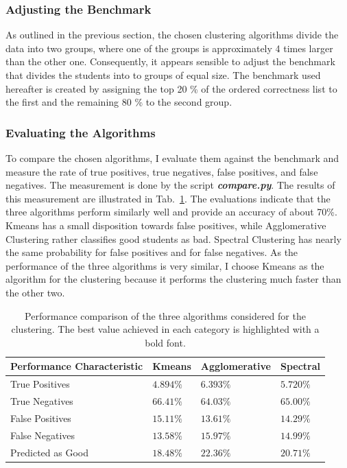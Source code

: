 \subsubsection{Adjusting the Benchmark}
As outlined in the previous section, the chosen clustering algorithms divide the data into two groups, where one of the groups is approximately 4 times larger than the other one. Consequently, it appears sensible to adjust the benchmark that divides the students into to groups of equal size. The benchmark used hereafter is created by assigning the top 20 \% of the ordered correctness list to the first and the remaining 80 \% to the second group.


\subsubsection{Evaluating the Algorithms}
To compare the chosen algorithms, I evaluate them against the benchmark and measure the rate of true positives, true negatives, false positives, and false negatives. The measurement is done by the script \textbf{\emph{compare.py}}. The results of this measurement are illustrated in Tab.~\ref{tab_comparison}. The evaluations indicate that the three algorithms perform similarly well and provide an accuracy of about 70\%. Kmeans has a small disposition towards false positives, while Agglomerative Clustering rather classifies good students as bad. Spectral Clustering has nearly the same probability for false positives and for false negatives. As the performance of the three algorithms is very similar, I choose Kmeans as the algorithm for the clustering because it performs the clustering much faster than the other two.   


\begin{table}[b]
	\centering
	\caption{Performance comparison of the three algorithms considered for the clustering. The best value achieved in each category is highlighted with a bold font.\label{tab_comparison}}
	\begin{tabular}{llll}
		\toprule
		Performance Characteristic & Kmeans & Agglomerative & Spectral \\		
		\midrule
		True Positives & $4.894\%$ & $\boldsymbol{6.393\%}$ & $5.720\%$\\
		True Negatives & $\boldsymbol{66.41\%}$ & $64.03\%$ & $65.00\%$\\
		False Positives & $15.11\%$ & $\boldsymbol{13.61\%}$ & $14.29\%$\\
		False Negatives & $\boldsymbol{13.58\%}$ & $15.97\%$ & $14.99\%$\\
		Predicted as Good & $18.48\%$ & $22.36\%$ & $20.71\%$\\
		\bottomrule
	\end{tabular}
\end{table}

